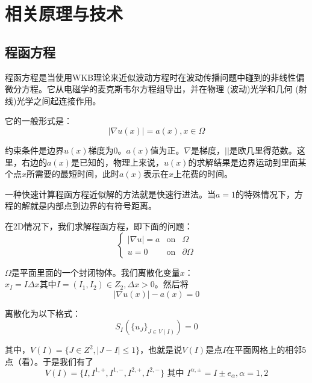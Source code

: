 \chapter{相关原理与技术}

\section{程函方程}
程函方程是当使用WKB理论来近似波动方程时在波动传播问题中碰到的非线性偏微分方程。它从电磁学的麦克斯韦尔方程组导出，并在物理 (波动)光学和几何 (射线)光学之间起连接作用。

它的一般形式是：
\begin{equation}
    \label{eikonal_equation_1}
    \left| \nabla u(x) \right| = a(x), x \in \Omega
\end{equation}

约束条件是边界$u(x)$梯度为0。$a(x)$值为正。$\nabla$是梯度，$\left| \right|$是欧几里得范数。这里，右边的$a(x)$是已知的，物理上来说，$u(x)$的求解结果是边界运动到里面某个点$x$所需要的最短时间，此时$a(x)$表示在$x$上花费的时间。

一种快速计算程函方程近似解的方法就是快速行进法。当$a = 1$的特殊情况下，方程的解就是内部点到边界的有符号距离。

在2D情况下，我们求解程函方程，即下面的问题：
\begin{equation*}
    \label{eikonal_equation_2}
    \left\{
    \begin{aligned}
    \left| \nabla u \right| = a & \mbox{on} & \Omega \\
    u = 0 & \mbox{on} &  \partial\Omega
    \end{aligned}
    \right.
\end{equation*}

$\Omega$是平面里面的一个封闭物体。我们离散化变量$x$：$x_{I} = I\Delta x\mbox{其中}I = (I_{1}, I_{2}) \in Z_{2}, \Delta x > 0$。然后将
\begin{equation*}
    \label{eikonal_equation_3}
    \left| \nabla u(x) \right| - a(x) = 0
\end{equation*}

离散化为以下格式：
\begin{equation*}
    \label{scheme}
    S_{I}(\{u_{J}\}_{J \in V(I)}) = 0
\end{equation*}

其中，$V(I) = \{J \in Z^{2}, \left| J - I \right| \leq 1\}$，也就是说$V(I)$是点$I$在平面网格上的相邻5点（看）。于是我们有了
\begin{equation*}
    \label{eikonal_equation_3}
    V(I) = \{I, I^{1, +}, I^{1, -}, I^{2, +}, I^{2, -}\} \mbox{ 其中 } I^{\alpha, \pm}  = I \pm e_{\alpha}, \alpha = 1, 2
\end{equation*}

